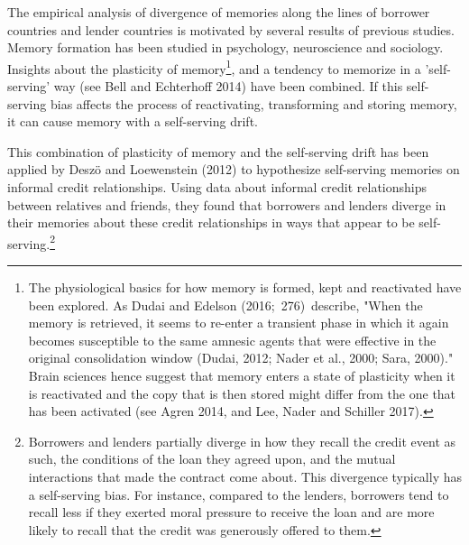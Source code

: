The empirical analysis of divergence of memories along the lines of borrower
countries and lender countries is motivated by several results of previous studies.
Memory formation has been studied in psychology, neuroscience and sociology.
Insights about the plasticity of memory\footnote{%
The physiological basics for how memory is formed, kept and reactivated have
been explored. As Dudai and Edelson (2016;\ 276)\ describe, "When the memory
is retrieved, it seems to re-enter a transient phase in which it again
becomes susceptible to the same amnesic agents that were effective in the
original consolidation window (Dudai, 2012; Nader et al., 2000; Sara,
2000)." Brain sciences hence suggest that memory enters a state of
plasticity when it is reactivated and the copy that is then stored might
differ from the one that has been activated (see Agren 2014, and Lee, Nader
and Schiller 2017).}, and a tendency to memorize in a 'self-serving' way
(see Bell and Echterhoff 2014) have been combined. If this self-serving bias
affects the process of reactivating, transforming and storing memory, it can
cause memory with a self-serving drift.

This combination of plasticity of memory and the self-serving drift has been
applied by Desz\"{o} and Loewenstein (2012) to hypothesize self-serving
memories on informal credit relationships. Using data about informal credit
relationships between relatives and friends, they found that borrowers and
lenders diverge in their memories about these credit relationships in
 ways that appear to be self-serving.\footnote{%
Borrowers and lenders partially diverge in how they recall the credit event
as such, the conditions of the loan they agreed upon, and the mutual
interactions that made the contract come about. This divergence typically
has a self-serving bias. For instance, compared to the lenders, borrowers
tend to recall less if they exerted moral pressure to receive the loan and
are more likely to recall that the credit was generously offered to them.}


